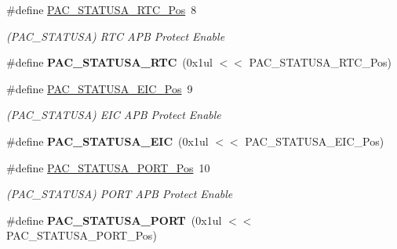 \begin{DoxyCompactItemize}
\item 
\hypertarget{group___s_a_m_l21___p_a_c_gac4930d9957067b060b9708721a4b1ef5}{}\#define \hyperlink{group___s_a_m_l21___p_a_c_gac4930d9957067b060b9708721a4b1ef5}{P\+A\+C\+\_\+\+S\+T\+A\+T\+U\+S\+A\+\_\+\+R\+T\+C\+\_\+\+Pos}~8\label{group___s_a_m_l21___p_a_c_gac4930d9957067b060b9708721a4b1ef5}

\begin{DoxyCompactList}\small\item\em (P\+A\+C\+\_\+\+S\+T\+A\+T\+U\+S\+A) R\+T\+C A\+P\+B Protect Enable \end{DoxyCompactList}\item 
\hypertarget{group___s_a_m_l21___p_a_c_ga38fd4dbc374628f71115849662724ea3}{}\#define {\bfseries P\+A\+C\+\_\+\+S\+T\+A\+T\+U\+S\+A\+\_\+\+R\+T\+C}~(0x1ul $<$$<$ P\+A\+C\+\_\+\+S\+T\+A\+T\+U\+S\+A\+\_\+\+R\+T\+C\+\_\+\+Pos)\label{group___s_a_m_l21___p_a_c_ga38fd4dbc374628f71115849662724ea3}

\item 
\hypertarget{group___s_a_m_l21___p_a_c_ga7c818bfff34cd0f8531ef638fb892ac8}{}\#define \hyperlink{group___s_a_m_l21___p_a_c_ga7c818bfff34cd0f8531ef638fb892ac8}{P\+A\+C\+\_\+\+S\+T\+A\+T\+U\+S\+A\+\_\+\+E\+I\+C\+\_\+\+Pos}~9\label{group___s_a_m_l21___p_a_c_ga7c818bfff34cd0f8531ef638fb892ac8}

\begin{DoxyCompactList}\small\item\em (P\+A\+C\+\_\+\+S\+T\+A\+T\+U\+S\+A) E\+I\+C A\+P\+B Protect Enable \end{DoxyCompactList}\item 
\hypertarget{group___s_a_m_l21___p_a_c_gaeeeec7e34fee80169239267f07de9401}{}\#define {\bfseries P\+A\+C\+\_\+\+S\+T\+A\+T\+U\+S\+A\+\_\+\+E\+I\+C}~(0x1ul $<$$<$ P\+A\+C\+\_\+\+S\+T\+A\+T\+U\+S\+A\+\_\+\+E\+I\+C\+\_\+\+Pos)\label{group___s_a_m_l21___p_a_c_gaeeeec7e34fee80169239267f07de9401}

\item 
\hypertarget{group___s_a_m_l21___p_a_c_gaeddcdd03c7e373f83d754b695fe625a4}{}\#define \hyperlink{group___s_a_m_l21___p_a_c_gaeddcdd03c7e373f83d754b695fe625a4}{P\+A\+C\+\_\+\+S\+T\+A\+T\+U\+S\+A\+\_\+\+P\+O\+R\+T\+\_\+\+Pos}~10\label{group___s_a_m_l21___p_a_c_gaeddcdd03c7e373f83d754b695fe625a4}

\begin{DoxyCompactList}\small\item\em (P\+A\+C\+\_\+\+S\+T\+A\+T\+U\+S\+A) P\+O\+R\+T A\+P\+B Protect Enable \end{DoxyCompactList}\item 
\hypertarget{group___s_a_m_l21___p_a_c_ga69254c65b701ae2f975d0603a2c77737}{}\#define {\bfseries P\+A\+C\+\_\+\+S\+T\+A\+T\+U\+S\+A\+\_\+\+P\+O\+R\+T}~(0x1ul $<$$<$ P\+A\+C\+\_\+\+S\+T\+A\+T\+U\+S\+A\+\_\+\+P\+O\+R\+T\+\_\+\+Pos)\label{group___s_a_m_l21___p_a_c_ga69254c65b701ae2f975d0603a2c77737}


\end{DoxyCompactItemize}
